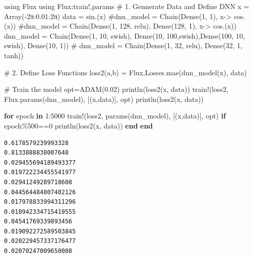 \documentclass[
  letterpaper,
  DIV=11,
  numbers=noendperiod]{scrreport}
\newenvironment{Shaded}{\begin{snugshade}}{\end{snugshade}}
\newcommand{\BuiltInTok}[1]{\textcolor[rgb]{0.00,0.23,0.31}{#1}}
\newcommand{\CharTok}[1]{\textcolor[rgb]{0.13,0.47,0.30}{#1}}
\newcommand{\CommentTok}[1]{\textcolor[rgb]{0.37,0.37,0.37}{#1}}
\newcommand{\ControlFlowTok}[1]{\textcolor[rgb]{0.00,0.23,0.31}{\textbf{#1}}}
\newcommand{\FloatTok}[1]{\textcolor[rgb]{0.68,0.00,0.00}{#1}}
\newcommand{\FunctionTok}[1]{\textcolor[rgb]{0.28,0.35,0.67}{#1}}
\newcommand{\ImportTok}[1]{\textcolor[rgb]{0.00,0.46,0.62}{#1}}
\newcommand{\KeywordTok}[1]{\textcolor[rgb]{0.00,0.23,0.31}{\textbf{#1}}}
\newcommand{\NormalTok}[1]{\textcolor[rgb]{0.00,0.23,0.31}{#1}}
\newcommand{\OperatorTok}[1]{\textcolor[rgb]{0.37,0.37,0.37}{#1}}
\begin{document}
\begin{Shaded}
\begin{Highlighting}[]
\ImportTok{using} \BuiltInTok{Flux}
\ImportTok{using} \BuiltInTok{Flux}\NormalTok{:train!,params}
\CommentTok{\# 1. Gennerate Data and Define DNN}
\NormalTok{x }\OperatorTok{=} \FunctionTok{Array}\NormalTok{(}\OperatorTok{{-}}\FloatTok{2}\NormalTok{π}\OperatorTok{:}\FloatTok{0.01}\OperatorTok{:}\FloatTok{2}\NormalTok{π)}\CharTok{\textquotesingle{}}
\NormalTok{data }\OperatorTok{=} \FunctionTok{sin}\NormalTok{.(x)}
\CommentTok{\#dnn\_model = Chain(Dense(1, 1), x{-}\textgreater{} cos.(x))}
\CommentTok{\#dnn\_model = Chain(Dense(1, 128, relu), Dense(128, 1), x{-}\textgreater{} cos.(x))}
\NormalTok{dnn\_model }\OperatorTok{=} \FunctionTok{Chain}\NormalTok{(}\FunctionTok{Dense}\NormalTok{(}\FloatTok{1}\NormalTok{, }\FloatTok{10}\NormalTok{, swish), }\FunctionTok{Dense}\NormalTok{(}\FloatTok{10}\NormalTok{, }\FloatTok{100}\NormalTok{,swish),}\FunctionTok{Dense}\NormalTok{(}\FloatTok{100}\NormalTok{, }\FloatTok{10}\NormalTok{, swish), }\FunctionTok{Dense}\NormalTok{(}\FloatTok{10}\NormalTok{, }\FloatTok{1}\NormalTok{))}
\CommentTok{\# dnn\_model = Chain(Dense(1, 32, relu), Dense(32, 1, tanh))}


\CommentTok{\# 2. Define Loss Functions}
\FunctionTok{loss2}\NormalTok{(a,b) }\OperatorTok{=}\NormalTok{ Flux.Losses.}\FunctionTok{mae}\NormalTok{(}\FunctionTok{dnn\_model}\NormalTok{(x), data)}

\CommentTok{\# Train the model}
\NormalTok{opt}\OperatorTok{=}\FunctionTok{ADAM}\NormalTok{(}\FloatTok{0.02}\NormalTok{)}
\FunctionTok{println}\NormalTok{(}\FunctionTok{loss2}\NormalTok{(x, data))}
\FunctionTok{train!}\NormalTok{(loss2, Flux.}\FunctionTok{params}\NormalTok{(dnn\_model), [(x,data)], opt)}
\FunctionTok{println}\NormalTok{(}\FunctionTok{loss2}\NormalTok{(x, data))}



\ControlFlowTok{for}\NormalTok{ epoch }\KeywordTok{in} \FloatTok{1}\OperatorTok{:}\FloatTok{5000}
    \FunctionTok{train!}\NormalTok{(loss2, }\FunctionTok{params}\NormalTok{(dnn\_model), [(x,data)], opt)}
    \ControlFlowTok{if}\NormalTok{ epoch}\OperatorTok{\%}\FloatTok{500}\OperatorTok{==}\FloatTok{0}
    \FunctionTok{println}\NormalTok{(}\FunctionTok{loss2}\NormalTok{(x, data))}
    \ControlFlowTok{end}
\ControlFlowTok{end}
\end{Highlighting}
\end{Shaded}

\begin{verbatim}
0.6178579239993328
0.8133888838007648
0.029455694189493377
0.019722234455541977
0.02941249289718608
0.044564484807402126
0.017978833994311296
0.018942334715419555
0.04541769339893456
0.019092272589503845
0.020229457337176477
0.02070247009650008
\end{verbatim}
\end{document}
